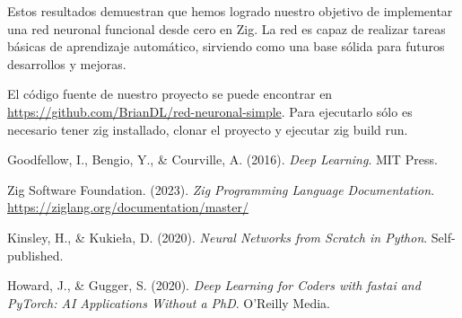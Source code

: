 \documentclass[twocolumn]{article}
\begin{document}
Estos resultados demuestran que hemos logrado nuestro objetivo de implementar una red neuronal funcional desde cero en Zig. La red es capaz de realizar tareas básicas de aprendizaje automático, sirviendo como una base sólida para futuros desarrollos y mejoras.

El código fuente de nuestro proyecto se puede encontrar en \url{https://github.com/BrianDL/red-neuronal-simple}. Para ejecutarlo sólo es necesario tener zig installado, clonar el proyecto y ejecutar zig build run.

\begin{thebibliography}{9}
Goodfellow, I., Bengio, Y., \& Courville, A. (2016). 
\textit{Deep Learning}. 
MIT Press.

Zig Software Foundation. (2023).
\textit{Zig Programming Language Documentation}.
\url{https://ziglang.org/documentation/master/}

Kinsley, H., \& Kukieła, D. (2020).
\textit{Neural Networks from Scratch in Python}.
Self-published.

Howard, J., \& Gugger, S. (2020).
\textit{Deep Learning for Coders with fastai and PyTorch: AI Applications Without a PhD}.
O'Reilly Media.
\end{thebibliography}
\end{document}
